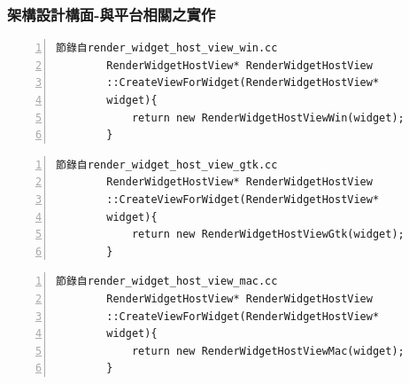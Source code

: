 \documentclass[utf8x]{beamer}
\begin{document}
\begin{frame}[fragile,t]%
\frametitle{架構設計構面-與平台相關之實作}
\begin{table}[h]
\begin{center}
\begin{minipage}{72mm}
\linespread{0.8}
\fontsize{8pt}{6pt}\selectfont
\begin{Verbatim}[numbers=left,framesep=1mm,numbersep=1pt] 
	節錄自render_widget_host_view_win.cc 
	    RenderWidgetHostView* RenderWidgetHostView
	    ::CreateViewForWidget(RenderWidgetHostView*
	    widget){
	        return new RenderWidgetHostViewWin(widget);
	    }
\end{Verbatim}
\end{minipage}
\end{center}
\end{table}
\begin{table}[h]
\begin{center}
\begin{minipage}{72mm}
\linespread{0.8}
\fontsize{8pt}{6pt}\selectfont
\begin{Verbatim}[numbers=left,framesep=1mm,numbersep=1pt] 
	節錄自render_widget_host_view_gtk.cc 
	    RenderWidgetHostView* RenderWidgetHostView
	    ::CreateViewForWidget(RenderWidgetHostView*
	    widget){
	        return new RenderWidgetHostViewGtk(widget);
	    }
\end{Verbatim}
\end{minipage}
\end{center}
\end{table}
\begin{table}[h]
\begin{center}
\begin{minipage}{72mm}
\linespread{0.8}
\fontsize{8pt}{6pt}\selectfont
\begin{Verbatim}[numbers=left,framesep=1mm,numbersep=1pt] 
	節錄自render_widget_host_view_mac.cc 
	    RenderWidgetHostView* RenderWidgetHostView
	    ::CreateViewForWidget(RenderWidgetHostView*
	    widget){
	        return new RenderWidgetHostViewMac(widget);
	    }
\end{Verbatim}
\end{minipage}
\end{center}
\end{table}
\end{frame}
\end{document}

